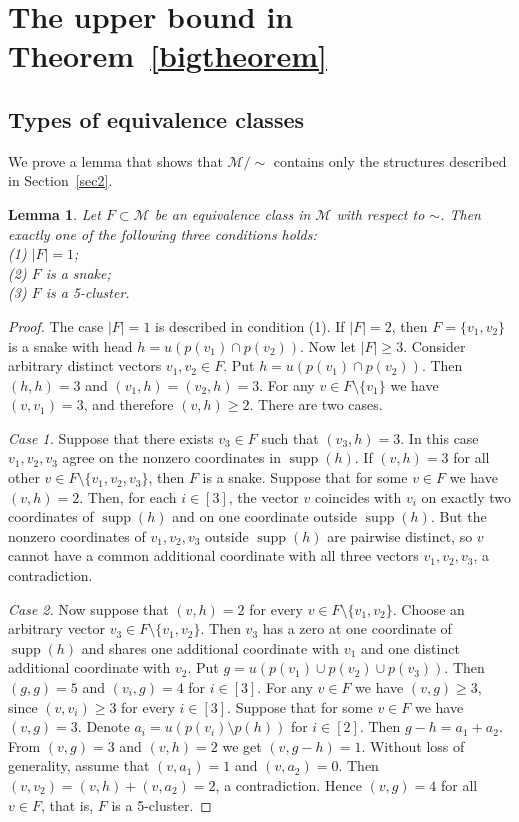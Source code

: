 \documentclass[12pt,a4paper]{article}
\newcommand{\M}{\mathcal{M}}
\DeclareMathOperator{\supp}{supp}
\newtheorem{lemma}[theorem]{Lemma}
\begin{document}
\section{The upper bound in Theorem~\ref{bigtheorem}}

\subsection{Types of equivalence classes}\label{ss31}

We prove a lemma that shows that $\M/\sim$ contains only the structures described in Section~\ref{sec2}.

\begin{lemma}\label{lem22}
    Let $F \subset \M$ be an equivalence class in $\M$ with respect to $\sim$. Then exactly one of the following three conditions holds:\\
    (1) $|F| = 1$;\\
    (2) $F$ is a snake;\\
    (3) $F$ is a 5-cluster.
\end{lemma}

\begin{proof}

The case $|F|=1$ is described in condition (1). If $|F|=2$, then $F=\{v_1, v_2\}$ is a snake with head $h = u(p(v_1)\cap p(v_2))$. Now let $|F| \geqslant 3$. Consider arbitrary distinct vectors $v_1,v_2\in F$. Put $h = u(p(v_1)\cap p(v_2))$. Then $(h,h)=3$ and $(v_1,h)=(v_2,h)=3$. For any $v \in F \setminus \{v_1\}$ we have $(v,v_1)=3$, and therefore $(v,h)\geqslant 2$. There are two cases.

\emph{Case 1.} Suppose that there exists $v_3 \in F$ such that $(v_3,h)=3$. In this case $v_1,v_2,v_3$ agree on the nonzero coordinates in $\supp(h)$. If $(v,h)=3$ for all other $v \in F \setminus \{v_1,v_2,v_3\}$, then $F$ is a snake. Suppose that for some $v\in F$ we have $(v,h)=2$. Then, for each $i \in [3]$, the vector $v$ coincides with $v_i$ on exactly two coordinates of $\supp(h)$ and on one coordinate outside $\supp(h)$. But the nonzero coordinates of $v_1,v_2,v_3$ outside $\supp(h)$ are pairwise distinct, so $v$ cannot have a common additional coordinate with all three vectors $v_1,v_2,v_3$, a contradiction.

\emph{Case 2.} Now suppose that $(v,h)=2$ for every $v \in F \setminus \{v_1,v_2\}$. Choose an arbitrary vector $v_3 \in F \setminus \{v_1,v_2\}$. Then $v_3$ has a zero at one coordinate of $\supp(h)$ and shares one additional coordinate with $v_1$ and one distinct additional coordinate with $v_2$. Put $g = u(p(v_1)\cup p(v_2)\cup p(v_3))$. Then $(g,g)=5$ and $(v_i,g)=4$ for $i \in [3]$. For any $v \in F$ we have $(v,g) \geqslant 3$, since $(v,v_i) \geqslant 3$ for every $i \in [3]$. Suppose that for some $v\in F$ we have $(v,g) = 3$. Denote $a_i = u(p(v_i)\setminus p(h))$ for $i \in [2]$. Then $g-h=a_1+a_2$. From $(v,g)=3$ and $(v,h)= 2$ we get $(v,g-h)=1$. Without loss of generality, assume that $(v,a_1)=1$ and $(v,a_2)=0$. Then $(v,v_2)=(v,h)+(v,a_2)=2$, a contradiction. Hence $(v,g)=4$ for all $v\in F$, that is, $F$ is a 5-cluster.

\end{proof}
\end{document}
